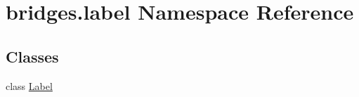 \hypertarget{namespacebridges_1_1label}{}\section{bridges.\+label Namespace Reference}
\label{namespacebridges_1_1label}
\subsection*{Classes}
\begin{DoxyCompactItemize}
\item 
class \hyperlink{classbridges_1_1label_1_1_label}{Label}
\end{DoxyCompactItemize}

